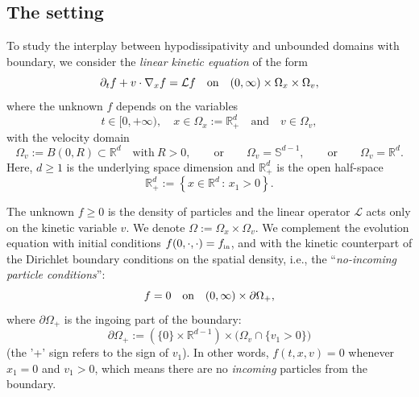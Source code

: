 \documentclass[11pt]{amsart}
\theoremstyle{definition}
\theoremstyle{remark}
\numberwithin{equation}{section}
\newcommand\R{{\mathbb R}}
\newcommand{\init}{\text{{\tiny {\rm in}}}}
\newcommand{\cL}{\mathcal{L}}
\begin{document}
\subsection{The setting}
\label{subsec:setting}

To study the interplay between hypodissipativity and unbounded domains with boundary, we consider the \emph{linear kinetic equation} of the form
\begin{equation}
  \label{eq:main}
  \partial_t f + v \cdot \nabla_x f = \cL f \quad \hbox{on}\quad (0,\infty) \times \Omega_x \times \Omega_v,
\end{equation}
where the unknown $f$ depends on the variables
\begin{equation*}
  t \in [0,+\infty), \quad x \in \Omega_x := \R_+^d \quad \text{and} \quad v \in \Omega_v,
\end{equation*}
with the velocity domain
\begin{equation*}
  \Omega_v := B(0,R) \subset \R^d \quad \text{with} \ R>0, \qquad \text{or} \qquad \Omega_v = \mathbb{S}^{d-1}, \qquad \text{or} \qquad \Omega_v = \R^d.
\end{equation*}
Here, $d \ge 1$ is the underlying space dimension and $\R_+^d$ is the open half-space
\begin{equation*}
  \R_+^d := \left\{ x \in \R^d \, : \, x_1 > 0 \right\}.
\end{equation*}

The unknown $f \ge 0$ is the density of particles and the linear operator $\mathcal L$ acts only on the kinetic variable $v$. We denote $\Omega := \Omega_x \times \Omega_v$. We complement the evolution equation with initial conditions $f(0,\cdot,\cdot)=f_{\init}$, and with the kinetic counterpart of the Dirichlet boundary conditions on the spatial density, i.e., the ``\emph{no-incoming particle conditions}'':
\begin{equation}
  \label{eq:mainBoundary}
  f = 0 \quad \hbox{on}\quad (0,\infty) \times \partial\Omega_+ ,
\end{equation}
where $\partial\Omega_+$ is the ingoing part of the boundary:
\begin{equation*}
  \partial\Omega_+ := \left(\{0\} \times \R^{d-1} \right) \times \Big(\Omega_v \cap \{v_1 > 0 \}\Big)
\end{equation*}
(the '+' sign refers to the sign of $v_1$).
In other words, $f(t,x,v)=0$ whenever $x_1=0$ and $v_1 > 0$, which means there are no \emph{incoming} particles from the boundary.
\end{document}
